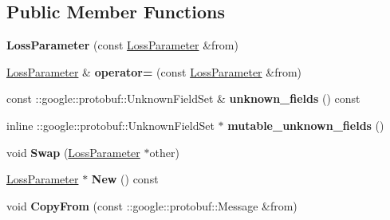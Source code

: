 \subsection*{Public Member Functions}
\begin{DoxyCompactItemize}
\item 
\mbox{\label{classcaffe_1_1_loss_parameter_ac34546031057fb794965d000c7ed7061}} 
{\bfseries Loss\+Parameter} (const \mbox{\hyperlink{classcaffe_1_1_loss_parameter}{Loss\+Parameter}} \&from)
\item 
\mbox{\label{classcaffe_1_1_loss_parameter_ad2dc5e91ce7e0de59b25275f1ef6a31f}} 
\mbox{\hyperlink{classcaffe_1_1_loss_parameter}{Loss\+Parameter}} \& {\bfseries operator=} (const \mbox{\hyperlink{classcaffe_1_1_loss_parameter}{Loss\+Parameter}} \&from)
\item 
\mbox{\label{classcaffe_1_1_loss_parameter_a17717f040cab8bccc7c4a072152596b7}} 
const \+::google\+::protobuf\+::\+Unknown\+Field\+Set \& {\bfseries unknown\+\_\+fields} () const
\item 
\mbox{\label{classcaffe_1_1_loss_parameter_ae1b33bf6d3d2f3d79b36a49c7c092122}} 
inline \+::google\+::protobuf\+::\+Unknown\+Field\+Set $\ast$ {\bfseries mutable\+\_\+unknown\+\_\+fields} ()
\item 
\mbox{\label{classcaffe_1_1_loss_parameter_ace0b0e1aa8bf9d0b726c2c9d4218ed89}} 
void {\bfseries Swap} (\mbox{\hyperlink{classcaffe_1_1_loss_parameter}{Loss\+Parameter}} $\ast$other)
\item 
\mbox{\label{classcaffe_1_1_loss_parameter_a3805e407795aaed5f1983983550a6319}} 
\mbox{\hyperlink{classcaffe_1_1_loss_parameter}{Loss\+Parameter}} $\ast$ {\bfseries New} () const
\item 
\mbox{\label{classcaffe_1_1_loss_parameter_a32675bad91c328c24b302d3176a1c2c0}} 
void {\bfseries Copy\+From} (const \+::google\+::protobuf\+::\+Message \&from)
\item 
\mbox{\label{classcaffe_1_1_loss_parameter_a428590d6b4a905648fab3ed3d8d4f7da}} 

\end{DoxyCompactItemize}
